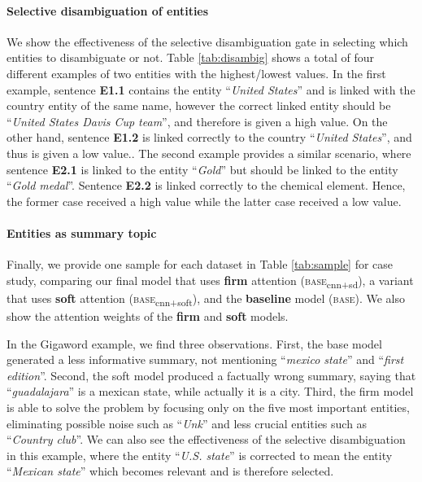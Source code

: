 \documentclass[11pt,a4paper]{article}
\begin{document}
\paragraph{Selective disambiguation of entities}

We show the effectiveness of the selective disambiguation gate  in selecting which entities to disambiguate or not. Table \ref{tab:disambig} shows a total of four different examples of two entities with the highest/lowest  values. In the first example, sentence \textbf{E1.1} contains the entity ``\textit{United States}'' and is linked with the country entity of the same name, however the correct linked entity should be ``\textit{United States Davis Cup team}'', and therefore is given a high  value. On the other hand, sentence \textbf{E1.2} is linked correctly to the country ``\textit{United States}'', and thus is given a low  value.. The second example provides a similar scenario, where sentence \textbf{E2.1} is linked to the entity ``\textit{Gold}'' but should be linked to the entity ``\textit{Gold medal}''. Sentence \textbf{E2.2} is linked correctly to the chemical element. Hence, the former case received a high value  while the latter case received a low  value.

\paragraph{Entities as summary topic}

Finally, we provide one sample for each dataset in Table \ref{tab:sample} for case study, comparing our final model that uses \textbf{firm} attention (\textsc{base}\textsubscript{cnn+sd}), a variant that uses \textbf{soft} attention (\textsc{base}\textsubscript{cnn+soft}), and the \textbf{baseline} model (\textsc{base}). We also show the attention weights of the \textbf{firm} and \textbf{soft} models.

In the Gigaword example, we find three observations.
First, the base model generated a less informative summary, not mentioning ``\textit{mexico state}'' and ``\textit{first edition}''.
Second, the soft model produced a factually wrong summary, saying that ``\textit{guadalajara}'' is a mexican state, while actually it is a city.
Third, the firm model is able to solve the problem by focusing only on the five most important entities, eliminating possible noise such as ``\textit{Unk}'' and less crucial entities such as ``\textit{Country club}''. We can also see the effectiveness of the selective disambiguation in this example, where the entity ``\textit{U.S. state}'' is corrected to mean the entity ``\textit{Mexican state}'' which becomes relevant and is therefore selected.
\end{document}
